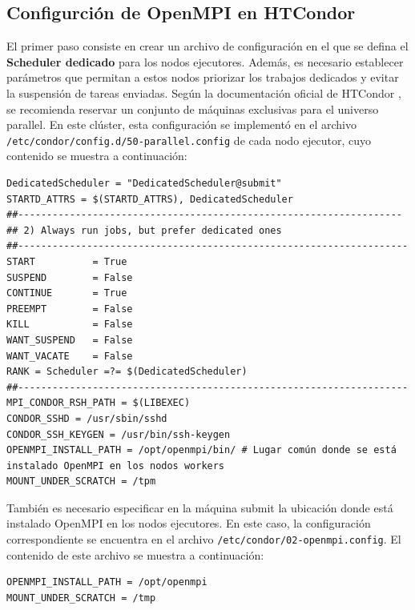 \FloatBarrier\subsection{Configurción de OpenMPI en HTCondor}

El primer paso consiste en crear un archivo de configuración en el que se defina el \textbf{Scheduler dedicado} para los nodos ejecutores. Además, es necesario establecer parámetros que permitan a estos nodos priorizar los trabajos dedicados y evitar la suspensión de tareas enviadas. Según la documentación oficial de HTCondor \cite{HTCondor_Parallel}, se recomienda reservar un conjunto de máquinas exclusivas para el universo parallel. En este clúster, esta configuración se implementó en el archivo \texttt{/etc/condor/config.d/50-parallel.config} de cada nodo ejecutor, cuyo contenido se muestra a continuación:


\begin{verbatim}
DedicatedScheduler = "DedicatedScheduler@submit"
STARTD_ATTRS = $(STARTD_ATTRS), DedicatedScheduler
##-------------------------------------------------------------------
## 2) Always run jobs, but prefer dedicated ones
##--------------------------------------------------------------------
START          = True
SUSPEND        = False
CONTINUE       = True
PREEMPT        = False
KILL           = False
WANT_SUSPEND   = False
WANT_VACATE    = False
RANK = Scheduler =?= $(DedicatedScheduler) 
##--------------------------------------------------------------------
MPI_CONDOR_RSH_PATH = $(LIBEXEC)
CONDOR_SSHD = /usr/sbin/sshd
CONDOR_SSH_KEYGEN = /usr/bin/ssh-keygen
OPENMPI_INSTALL_PATH = /opt/openmpi/bin/ # Lugar común donde se está instalado OpenMPI en los nodos workers
MOUNT_UNDER_SCRATCH = /tpm
\end{verbatim}

También es necesario especificar en la máquina submit la ubicación donde está instalado OpenMPI en los nodos ejecutores. En este caso, la configuración correspondiente se encuentra en el archivo \texttt{/etc/condor/02-openmpi.config}. El contenido de este archivo se muestra a continuación:

\begin{verbatim}
OPENMPI_INSTALL_PATH = /opt/openmpi
MOUNT_UNDER_SCRATCH = /tmp
\end{verbatim}






